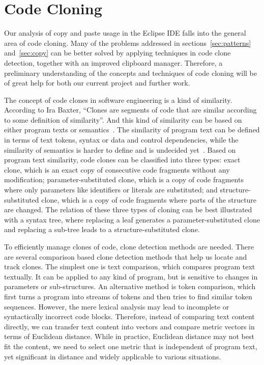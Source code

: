 \documentclass{acm_proc_article-sp}
\begin{document}
\section{Code Cloning}\label{sec:clones}

Our analysis of copy and paste usage in the Eclipse IDE falls into the general area of code cloning. Many of the problems addressed in sections~\ref{sec:patterns} and~\ref{sec:copy} can be better solved by applying techniques in code clone detection, together with an improved clipboard manager. Therefore, a preliminary understanding of the concepts and techniques of code cloning will be of great help for both our current project and further work. 

The concept of code clones in software engineering is a kind of similarity. According to Ira Baxter, ``Clones are segments of code that are similar according to some definition of similarity''. And this kind of similarity can be based on either program texts or semantics~\cite{frontiers}. The similarity of program text can be defined in terms of text tokens, syntax or data and control dependencies, while the similarity of semantics is harder to define and is undecided yet~\cite{frontiers}. Based on program text similarity, code clones can be classified into three types: exact clone, which is an exact copy of consecutive code fragments without any modification; parameter-substituted clone, which is a copy of code fragments where only parameters like identifiers or literals are substituted; and structure-substituted clone, which is a copy of code fragments where parts of the structure are changed. The relation of these three types of cloning can be best illustrated with a syntax tree, where replacing a leaf generates a parameter-substituted clone and replacing a sub-tree leads to a structure-substituted clone. 

To efficiently manage clones of code, clone detection methods are needed. There are several comparison based clone detection methods that help us locate and track clones. The simplest one is text comparison, which compares program text textually. It can be applied to any kind of program, but is sensitive to changes in parameters or sub-structures. An alternative method is token comparison, which first turns a program into streams of tokens and then tries to find similar token sequences. However, the mere lexical analysis may lead to incomplete or syntactically incorrect code blocks. Therefore, instead of comparing text content directly, we can transfer text content into vectors and compare metric vectors in terms of Euclidean distance. While in practice, Euclidean distance may not best fit the content, we need to select one metric that is independent of program text, yet significant in distance and widely applicable to various situations. 
\end{document}
